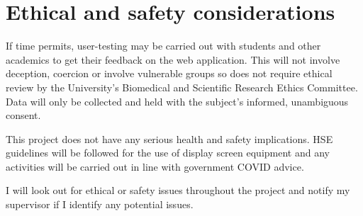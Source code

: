 \documentclass[12pt]{article}
\begin{document}
\section{Ethical and safety considerations}

If time permits, user-testing may be carried out with students and other academics to get their feedback on the web application. This will not involve deception, coercion or involve vulnerable groups so does not require ethical review by the University’s Biomedical and Scientific Research Ethics Committee. Data will only be collected and held with the subject's informed, unambiguous consent.

This project does not have any serious health and safety implications. HSE guidelines will be followed for the use of display screen equipment and any activities will be carried out in line with government COVID advice.

I will look out for ethical or safety issues throughout the project and notify my supervisor if I identify any potential issues.




\end{document}
